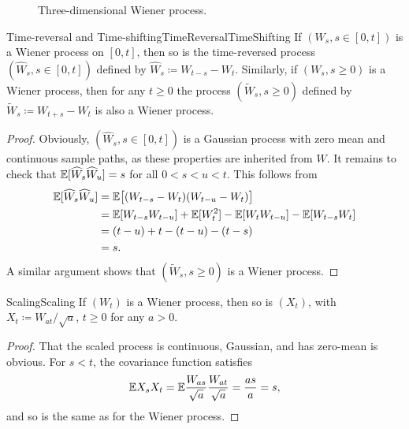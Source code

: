 \begin{figure}[H]
	\centering
	
	\caption{Three-dimensional Wiener process.}\label{fig:threeDimensionalBrownianMotionRealisations}
\end{figure}

\begin{thm}{Time-reversal and Time-shifting}{TimeReversalTimeShifting}
	If \((W_s, s \in [0, t])\) is a Wiener process on \([0, t]\), then so is the time-reversed process \((\widehat{W}_s, s \in [0, t])\) defined by \(\widehat{W}_s \coloneqq W_{t-s} - W_t\). Similarly, if \((W_s, s \ge 0)\) is a Wiener process, then for any \(t \ge 0\) the process \((\widetilde{W}_s, s \ge 0)\) defined by \(\widetilde{W}_s \coloneqq W_{t+s} - W_t\) is also a Wiener process.
\end{thm}

\begin{proof}
	Obviously, \((\widehat{W}_s, s \in [0, t])\) is a Gaussian process with zero mean and continuous sample paths, as these properties are inherited from \(W\). It remains to check that \(\mathbb{E}[\widehat{W}_s \widehat{W}_u] = s\) for all \(0 < s < u < t\). This follows from
	\begin{align*}
		\mathbb{E}[\widehat{W}_s \widehat{W}_u]
		 & = \mathbb{E}\big[(W_{t-s} - W_t)(W_{t-u} - W_t)\big]                          \\
		 & = \mathbb{E}[W_{t-s} W_{t-u}] + \mathbb{E}[W_t^2] - \mathbb{E}[W_t W_{t-u}] - \mathbb{E}[W_{t-s} W_t] \\
		 & = (t - u) + t - (t - u) - (t - s)                                     \\
		 & = s.
	\end{align*}
	A similar argument shows that \((\widetilde{W}_s, s \ge 0)\) is a Wiener process.
\end{proof}

\begin{thm}{Scaling}{Scaling}
	If \((W_t)\) is a Wiener process, then so is \((X_t)\), with \(X_t \coloneqq W_{at}/\sqrt{a}\), \(t \ge 0\) for any \(a > 0\).
\end{thm}

\begin{proof}
	That the scaled process is continuous, Gaussian, and has zero-mean is obvious. For \(s < t\), the covariance function satisfies
	\[
		\mathbb{E} X_s X_t = \mathbb{E} \frac{W_{as}}{\sqrt{a}} \frac{W_{at}}{\sqrt{a}} = \frac{as}{a} = s,
	\]
	and so is the same as for the Wiener process.
\end{proof}


